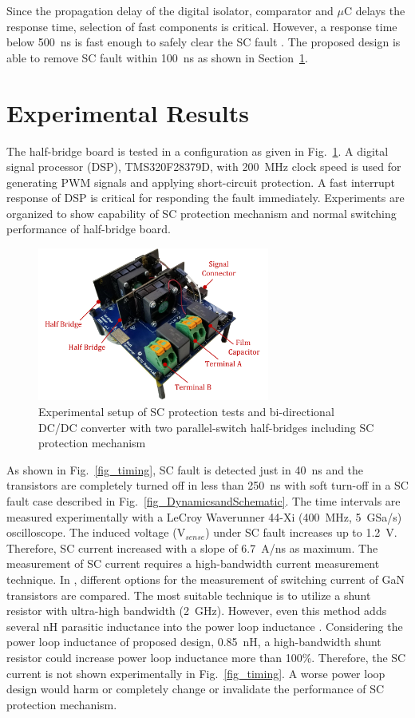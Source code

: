 \documentclass[journal]{IEEEtran}
\begin{document}
Since the propagation delay of the digital isolator, comparator and $\mu$C delays the response time, selection of fast components is critical. However, a response time below 500~ns is fast enough to safely clear the SC fault \cite{Lyu2020}. The proposed design is able to remove SC fault within 100~ns as shown in Section~\ref{sec:ExpRes}.

\section{Experimental Results}
\label{sec:ExpRes}
The half-bridge board is tested in a configuration as given in Fig.~\ref{fig_expsetup}. A digital signal processor (DSP), TMS320F28379D, with 200~MHz clock speed is used for generating PWM signals and applying short-circuit protection. A fast interrupt response of DSP is critical for responding the fault immediately. Experiments are organized to show capability of SC protection mechanism and normal switching performance of half-bridge board.

\begin{figure}[]
\centering
\includegraphics[width=3in]{Figures/Fig11-Setupv2.pdf}
\caption{Experimental setup of SC protection tests and bi-directional DC/DC converter with two parallel-switch half-bridges including SC protection mechanism}
\label{fig_expsetup}
\end{figure}

As shown in Fig.~\ref{fig_timing}, SC fault is detected just in 40~ns and the transistors are completely turned off in less than 250~ns with soft turn-off in a SC fault case described in Fig.~\ref{fig_DynamicsandSchematic}. The time intervals are measured experimentally with a LeCroy Waverunner 44-Xi (400~MHz, 5~GSa/s) oscilloscope. The induced voltage (V$_{sense}$) under SC fault increases up to 1.2~V. Therefore, SC current increased with a slope of 6.7~A/ns as maximum. The measurement of SC current requires a high-bandwidth current measurement technique. In \cite{Wang2017d}, different options for the measurement of switching current of GaN transistors are compared. The most suitable technique is to utilize a shunt resistor with ultra-high bandwidth (2~GHz). However, even this method adds several nH parasitic inductance into the power loop inductance \cite{Wang2017d}. Considering the power loop inductance of proposed design, 0.85~nH, a high-bandwidth shunt resistor could increase power loop inductance more than 100\%. Therefore, the SC current is not shown experimentally in Fig.~\ref{fig_timing}. A worse power loop design would harm or completely change or invalidate the performance of SC protection mechanism.
\end{document}
